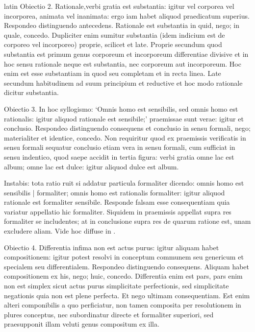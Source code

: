 \begin{otherlanguage*}{latin}
\pstart
 Obiectio 2. Rationale,verbi gratia est substantia: igitur vel corporea vel incorporea, animata vel inanimata: ergo iam habet aliquod praedicatum superius. Respondeo distinguendo antecedens. Rationale est substantia in quid, nego; in quale, concedo. Dupliciter enim sumitur substantia (idem indicium est de corporeo vel incorporeo) proprie, scilicet et late. Proprie secundum quod substantia est primum genus corporeum et incorporeum differentiae divisive et in hoc sensu rationale neque est substantia, nec corporeum aut incorporeum. Hoc enim est esse substantiam in quod seu completam et in recta linea. Late secundum habitudinem ad suum principium et reductive et hoc modo rationale dicitur substantia. 
\pend

\pstart
 Obiectio 3. In hoc syllogismo: `Omnis homo est sensibilis, sed omnis homo est rationalis: igitur aliquod rationale est sensibile;' praemissae sunt verae: igitur et conclusio. Respondeo distinguendo consequens et conclusio in sensu formali, nego; materialiter et identice, concedo. Non requiritur quod ex praemissis verificatis in sensu formali sequatur conclusio etiam vera in sensu formali, cum sufficiat in sensu indentico, quod saepe accidit in tertia figura: verbi gratia omne lac est album; omne lac est dulce: igitur aliquod dulce est album. 
\pend

\pstart
 Instabis: tota ratio ruit si addatur particula formaliter dicendo: omnis homo est sensibilis \textnormal{|}   formaliter; omnis homo est rationalis formaliter: igitur aliquod rationale est formaliter sensibile. Responde falsam esse consequentiam quia variatur appellatio hic formaliter. Siquidem in praemissis appellat supra res formaliter se includentes; at in conclusione supra res de quarum ratione est, unam excludere aliam. Vide hoc diffuse in . 
\pend

\pstart
 Obiectio 4. Differentia infima non est actus purus: igitur aliquam habet compositionem: igitur potest resolvi in conceptum communem seu genericum et specialem seu differentialem. Respondeo distinguendo consequens. Aliquam habet compositionem ex his, nego; huic, concedo. Differentia enim est pars, pars enim non est simplex sicut actus purus simplicitate perfectionis, sed simplicitate negationis quia non est plene perfecta. Et nego ultimam consequentiam. Est enim alteri componibilis a quo perficiatur, non tamen composita per resolutionem in plures conceptus, nec subordinatur directe et formaliter superiori, sed praesupponit illam veluti genus compositum ex illa. 
\pend


\end{otherlanguage*}
